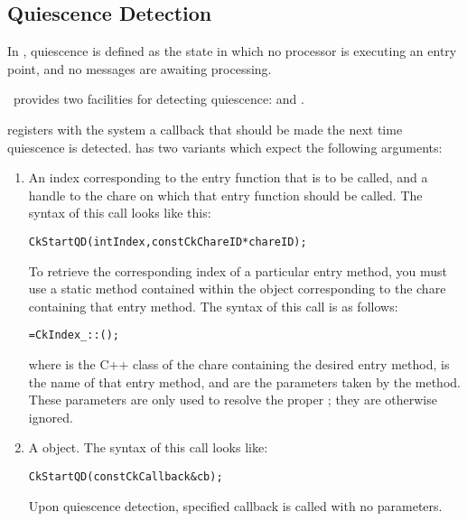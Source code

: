 \subsection{Quiescence Detection}

\label{sec:qd}

In \charmpp, quiescence is defined as the state in which no
processor is executing an entry point, and no messages are awaiting processing.

\charmpp\ provides two facilities for detecting quiescence:  and
.

 registers with the system a callback that should be made the
next time quiescence is detected.   has two
variants which expect the following arguments: 
\begin{enumerate}
\item An index corresponding to the entry function that is to be called,
and a handle to the chare on which that entry function should be called.  The
syntax of this call looks like this:

\begin{alltt}
 CkStartQD(int Index,const CkChareID* chareID);
\end{alltt}

To retrieve the corresponding index of a particular entry
method, you must use a static method contained within the  object
corresponding to the chare containing that entry method.  The
syntax of this call is as follows:

\begin{alltt}
=CkIndex_::();
\end{alltt}

where  is the C++ class of the chare containing
the desired entry method,  is the name of that entry method,
and  are the parameters taken by the method.
These parameters are only used to resolve the proper ;
they are otherwise ignored.

\item 
A  object. The syntax of this call looks like:
\begin{alltt}
  CkStartQD(const CkCallback& cb);
\end{alltt}

Upon quiescence detection, specified callback is called with no parameters.

\end{enumerate}



